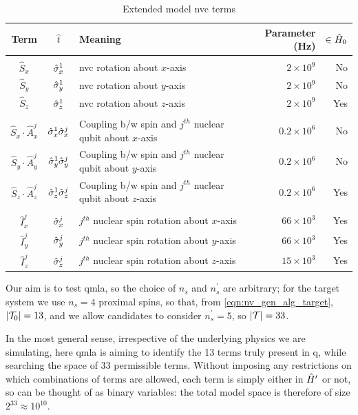 \par 

\begin{table}
    \begin{tabular}{cclrr}
        Term & $\hat{t}$ & Meaning & Parameter (Hz) & $ \in \hat{H}_0$ \\
        \hline
        \\
        $\hat{S}_x$ & $\hat{\sigma}_{x}^1$ & \gls{nvc} rotation about $x$-axis & $ 2\times 10^9 $ & No \\
        $\hat{S}_y$ & $\hat{\sigma}_{y}^1$ & \gls{nvc} rotation about $y$-axis & $ 2\times 10^9 $ & No \\
        $\hat{S}_z$ & $\hat{\sigma}_{z}^1$ & \gls{nvc} rotation about $z$-axis & $ 2\times 10^9 $ & Yes \\
        \\
        $\hat{S}_x \cdot \hat{A}_x^j$ & $\hat{\sigma}_{x}^1 \hat{\sigma}_{x}^j$ & Coupling b/w spin and $j^{th}$ nuclear qubit about $x$-axis & $ 0.2 \times 10^6 $ & No \\
        $\hat{S}_y \cdot \hat{A}_y^j$ & $\hat{\sigma}_{y}^1 \hat{\sigma}_{y}^j$ & Coupling b/w spin and $j^{th}$ nuclear qubit about $y$-axis & $ 0.2 \times 10^6 $ & No \\
        $\hat{S}_z \cdot \hat{A}_z^j$ & $\hat{\sigma}_{z}^1 \hat{\sigma}_{z}^j$ & Coupling b/w spin and $j^{th}$ nuclear qubit about $z$-axis & $ 0.2 \times 10^6 $ & Yes \\
        \\
        $\hat{I}_x^j$ & $\hat{\sigma}_{x}^j$ & $j^{th}$ nuclear spin rotation about $x$-axis & $ 66\times 10^3$ & Yes \\
        $\hat{I}_y^j$ & $\hat{\sigma}_{y}^j$ & $j^{th}$ nuclear spin rotation about $y$-axis & $ 66\times 10^3 $ & Yes \\
        $\hat{I}_z^j$ & $\hat{\sigma}_{z}^j$ & $j^{th}$ nuclear spin rotation about $z$-axis & $ 15\times 10^3 $ & Yes \\
        \hline 
    \end{tabular}
    \caption[Extended model \gls{nvc} terms]{
        Extended model \gls{nvc} terms
    }
    \label{table:nv_gen_alg_term_params}
\end{table}

Our aim is to test \gls{qmla}, so the choice of $n_s$ and $n_s^{\prime}$ are arbitrary; 
    for the target system we use $n_s=4$ proximal spins, 
    so that, from \cref{eqn:nv_gen_alg_target},  $\left\lvert \mathcal{T}_0 \right\rvert = 13$,
    and we allow candidates to consider $n_s^{\prime}=5$, 
    so $\left\lvert \mathcal{T} \right\rvert = 33$. 
\par 

In the most general sense, irrespective of the underlying physics we are simulating, 
    here \gls{qmla} is aiming to identify the 13 terms truly present in \gls{q}, 
    while searching the space of 33 permissible terms. 
Without imposing any restrictions on which combinations of terms are allowed, 
    each term is simply either in $\hat{H}^{\prime}$ or not, so can be thought of as binary variables:
    the total \gls{model space} is therefore of size $2^{33} \approx 10^{10}$. 

